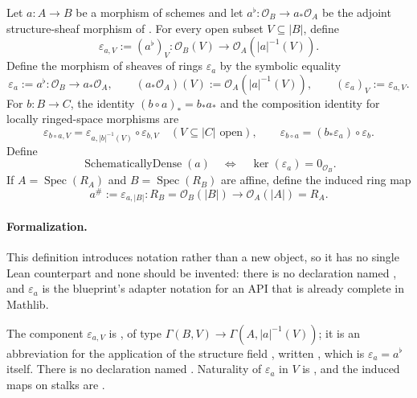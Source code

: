 \begin{definition}
  \label{def:nagata-direct-image-structure-map}
  \leanok

  Let $a\colon A\to B$ be a morphism of schemes and let
  \(a^\flat\colon\mathcal O_B\to a_*\mathcal O_A\) be the adjoint
  structure-sheaf morphism of
  .  For every open subset
  $V\subseteq|B|$, define
  \[
    \varepsilon_{a,V}:=(a^\flat)_V\colon
      \mathcal O_B(V)\longrightarrow
      \mathcal O_A(|a|^{-1}(V)).
  \]
  Define the morphism of sheaves of rings $\varepsilon_a$ by the symbolic
  equality
  \[
    \varepsilon_a:=a^\flat\colon
      \mathcal O_B\longrightarrow a_*\mathcal O_A,
    \qquad
    (a_*\mathcal O_A)(V):=\mathcal O_A(|a|^{-1}(V)),
    \qquad
    (\varepsilon_a)_V:=\varepsilon_{a,V}.
  \]
  For $b\colon B\to C$, the identity $(b\circ a)_*=b_*a_*$ and the
  composition identity for locally ringed-space morphisms are
  \[
    \varepsilon_{b\circ a,V}
      =\varepsilon_{a,|b|^{-1}(V)}\circ\varepsilon_{b,V}
      \quad(V\subseteq|C|\text{ open}),
    \qquad
    \varepsilon_{b\circ a}
      =(b_*\varepsilon_a)\circ\varepsilon_b.
  \]
  Define
  \[
    \operatorname{SchematicallyDense}(a)
      \quad\Longleftrightarrow\quad
    \ker(\varepsilon_a)=0_{\mathcal O_B}.
  \]
  If \(A=\operatorname{Spec}(R_A)\) and
  \(B=\operatorname{Spec}(R_B)\) are affine, define the induced ring map
  \[
    a^\#:=\varepsilon_{a,|B|}\colon
      R_B=\mathcal O_B(|B|)
      \longrightarrow
      \mathcal O_A(|A|)=R_A.                                      \tag{DIM0}
  \]

  \paragraph{Formalization.}
  This definition introduces notation rather than a new object, so it has no single Lean
  counterpart and none should be invented: there is no declaration named
  \texttt{}, and $\varepsilon_a$ is the
  blueprint's adapter notation for an API that is already complete in Mathlib.

  The component $\varepsilon_{a,V}$ is \texttt{}, of type
  $\Gamma(B,V)\to\Gamma(A,|a|^{-1}(V))$; it is an abbreviation for the application of the
  structure field \texttt{}, written
  \texttt{}, which is $\varepsilon_a=a^\flat$ itself.  There is no
  declaration named \texttt{}.  Naturality of $\varepsilon_a$ in $V$
  is \texttt{}, and the induced maps on stalks are
  \texttt{}.


\end{definition}
